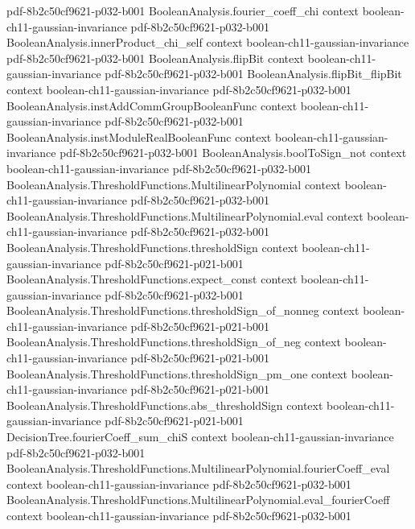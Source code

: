 \begin{lemma}
  {pdf-8b2c50cf9621-p032-b001}
\proofstep
  {BooleanAnalysis.fourier_coeff_chi}
  {context}
  {boolean-ch11-gaussian-invariance}
  {pdf-8b2c50cf9621-p032-b001}
\proofstep
  {BooleanAnalysis.innerProduct_chi_self}
  {context}
  {boolean-ch11-gaussian-invariance}
  {pdf-8b2c50cf9621-p032-b001}
\proofstep
  {BooleanAnalysis.flipBit}
  {context}
  {boolean-ch11-gaussian-invariance}
  {pdf-8b2c50cf9621-p032-b001}
\proofstep
  {BooleanAnalysis.flipBit_flipBit}
  {context}
  {boolean-ch11-gaussian-invariance}
  {pdf-8b2c50cf9621-p032-b001}
\proofstep
  {BooleanAnalysis.instAddCommGroupBooleanFunc}
  {context}
  {boolean-ch11-gaussian-invariance}
  {pdf-8b2c50cf9621-p032-b001}
\proofstep
  {BooleanAnalysis.instModuleRealBooleanFunc}
  {context}
  {boolean-ch11-gaussian-invariance}
  {pdf-8b2c50cf9621-p032-b001}
\proofstep
  {BooleanAnalysis.boolToSign_not}
  {context}
  {boolean-ch11-gaussian-invariance}
  {pdf-8b2c50cf9621-p032-b001}
\proofstep
  {BooleanAnalysis.ThresholdFunctions.MultilinearPolynomial}
  {context}
  {boolean-ch11-gaussian-invariance}
  {pdf-8b2c50cf9621-p032-b001}
\proofstep
  {BooleanAnalysis.ThresholdFunctions.MultilinearPolynomial.eval}
  {context}
  {boolean-ch11-gaussian-invariance}
  {pdf-8b2c50cf9621-p032-b001}
\proofstep
  {BooleanAnalysis.ThresholdFunctions.thresholdSign}
  {context}
  {boolean-ch11-gaussian-invariance}
  {pdf-8b2c50cf9621-p021-b001}
\proofstep
  {BooleanAnalysis.ThresholdFunctions.expect_const}
  {context}
  {boolean-ch11-gaussian-invariance}
  {pdf-8b2c50cf9621-p032-b001}
\proofstep
  {BooleanAnalysis.ThresholdFunctions.thresholdSign_of_nonneg}
  {context}
  {boolean-ch11-gaussian-invariance}
  {pdf-8b2c50cf9621-p021-b001}
\proofstep
  {BooleanAnalysis.ThresholdFunctions.thresholdSign_of_neg}
  {context}
  {boolean-ch11-gaussian-invariance}
  {pdf-8b2c50cf9621-p021-b001}
\proofstep
  {BooleanAnalysis.ThresholdFunctions.thresholdSign_pm_one}
  {context}
  {boolean-ch11-gaussian-invariance}
  {pdf-8b2c50cf9621-p021-b001}
\proofstep
  {BooleanAnalysis.ThresholdFunctions.abs_thresholdSign}
  {context}
  {boolean-ch11-gaussian-invariance}
  {pdf-8b2c50cf9621-p021-b001}
\proofstep
  {DecisionTree.fourierCoeff_sum_chiS}
  {context}
  {boolean-ch11-gaussian-invariance}
  {pdf-8b2c50cf9621-p032-b001}
\proofstep
  {BooleanAnalysis.ThresholdFunctions.MultilinearPolynomial.fourierCoeff_eval}
  {context}
  {boolean-ch11-gaussian-invariance}
  {pdf-8b2c50cf9621-p032-b001}
\proofstep
  {BooleanAnalysis.ThresholdFunctions.MultilinearPolynomial.eval_fourierCoeff}
  {context}
  {boolean-ch11-gaussian-invariance}
  {pdf-8b2c50cf9621-p032-b001}

\end{lemma}
